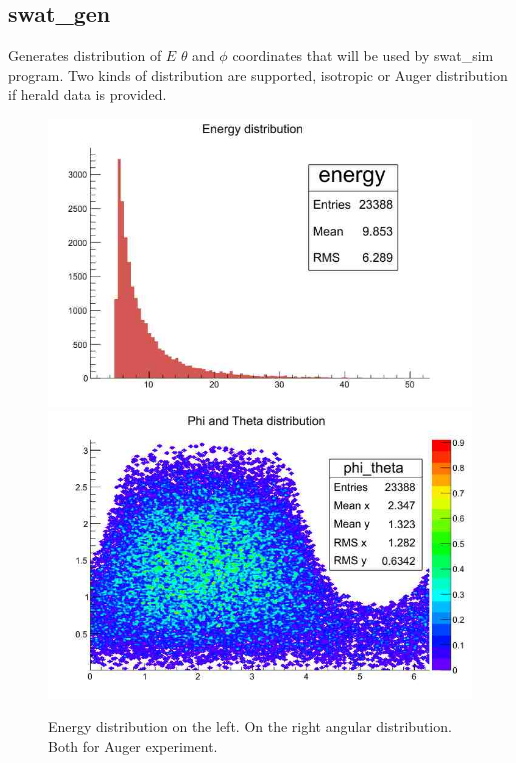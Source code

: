 \documentclass[12pt]{article}
\begin{document}
\subsection{swat\_gen}
Generates distribution of $E$ $\theta$ and $\phi$ coordinates that
will be used by swat\_sim program. Two kinds of distribution are
supported, isotropic or Auger distribution if herald data is provided.
\begin{figure}[ht]
   \centering
      \includegraphics[scale=0.25]{fig/energy.jpg}
      \includegraphics[scale=0.25]{fig/phi_theta.jpg}
   \caption{Energy distribution on the left. On the right
   angular distribution. Both for Auger experiment.}
   \label{healpix}
\end{figure}
\end{document}
